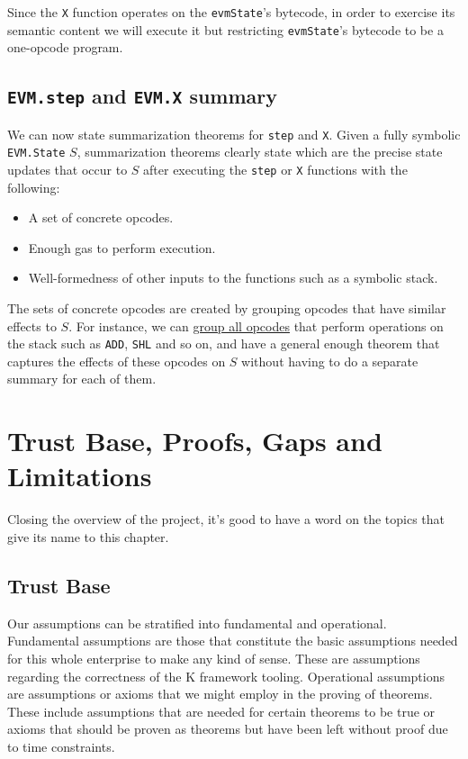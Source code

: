 Since the \texttt{X} function operates on the \texttt{evmState}'s bytecode, in
order to exercise its semantic content we will execute it but restricting
\texttt{evmState}'s bytecode to be a one-opcode program.

\section{\texttt{EVM.step} and \texttt{EVM.X} summary}

We can now state summarization theorems for \texttt{step} and \texttt{X}. Given
a fully symbolic \texttt{EVM.State} $S$, summarization theorems clearly state
which are the precise state updates that occur to $S$ after executing the
\texttt{step} or \texttt{X} functions with the following:

\begin{itemize}
\item A set of concrete opcodes.
\item Enough gas to perform execution.
\item Well-formedness of other inputs to the functions such as a symbolic stack.
\end{itemize}

The sets of concrete opcodes are created by grouping opcodes that have similar
effects to $S$.
For instance, we can
\href{https://runtimeverification.github.io/evm-equivalence/docs/EvmEquivalence/Summaries/StackOperationsSummary.html}{group
  all opcodes} that perform operations on the stack such as \texttt{ADD},
\texttt{SHL} and so on, and have a general enough theorem that captures the
effects of these opcodes on $S$ without having to do a separate summary for each
of them.


\chapter{Trust Base, Proofs, Gaps and Limitations}

Closing the overview of the project, it's good to have a word on the topics that give its name to this chapter.

\section{Trust Base}

Our assumptions can be stratified into fundamental and operational.
Fundamental assumptions are those that constitute the basic assumptions needed for this whole enterprise to make any kind of sense. These are assumptions regarding the correctness of the K framework tooling.
Operational assumptions are assumptions or axioms that we might employ in the proving of theorems. These include assumptions that are needed for certain theorems to be true or axioms that should be proven as theorems but have been left without proof due to time constraints.

